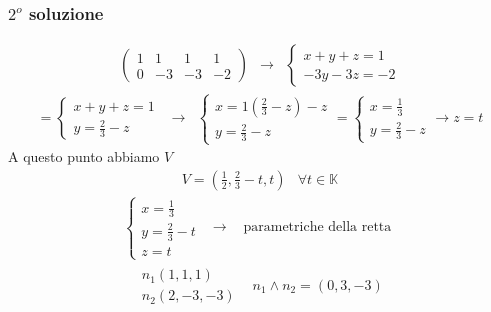 \subsubsection{$2^o$ soluzione}
\label{sec:soluzione2}

\begin{eqnarray*}
  \left(
  \begin{array}{ccc|l}
    1&1&1&1\\
    0 & -3 & -3&-2
  \end{array} \right)&\to&
                           \begin{cases}
                             x+y+z=1\\
                             -3y-3z=-2
                           \end{cases}
\end{eqnarray*}
\begin{eqnarray*}
  =
  \begin{cases}
    x+y+z=1\\
    y=\frac{2}{3}-z
  \end{cases}&\to&
  \begin{cases}
    x=1\left(\frac{2}{3}-z\right)-z\\
    y=\frac{2}{3}-z
  \end{cases}=
                   \begin{cases}
                     x=\frac{1}{3}\\
                     y=\frac{2}{3}-z
                   \end{cases}\to z=t
\end{eqnarray*}
A questo punto abbiamo $V$
\begin{eqnarray*}
  V=\left(\frac{1}{2},\frac{2}{3}-t,t\right) & \forall t \in \mathds{K}
\end{eqnarray*}
\begin{eqnarray*}
  \begin{cases}
    x=\frac{1}{3}\\
    y=\frac{2}{3}-t\\
    z=t
  \end{cases} & \to &
                      \begin{matrix}
                        \text{parametriche della retta} 
                      \end{matrix}
\end{eqnarray*}
\begin{eqnarray*}
  \begin{matrix}
    n_1(1,1,1)\\
    n_2(2,-3,-3)
  \end{matrix}& n_1\wedge n_2=(0,3,-3)
\end{eqnarray*}
\clearpage
